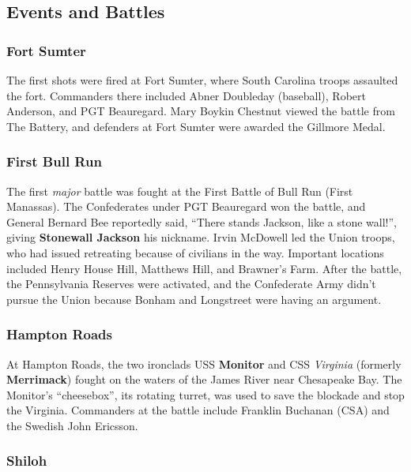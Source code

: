 
\subsection*{Events and Battles}

\subsubsection*{Fort Sumter}

The first shots were fired at Fort Sumter, where South Carolina troops assaulted the fort.
Commanders there included Abner Doubleday (baseball), Robert Anderson, and PGT Beauregard.
Mary Boykin Chestnut viewed the battle from The Battery,
and defenders at Fort Sumter were awarded the Gillmore Medal.

\subsubsection*{First Bull Run}

The first \textit{major} battle was fought at the First Battle of Bull Run (First Manassas).
The Confederates under PGT Beauregard won the battle,
and General Bernard Bee reportedly said, ``There stands Jackson, like a stone wall!'',
giving \textbf{Stonewall Jackson} his nickname.
Irvin McDowell led the Union troops, who had issued retreating because of civilians in the way.
Important locations included Henry House Hill, Matthews Hill, and Brawner's Farm.
After the battle, the Pennsylvania Reserves were activated,
and the Confederate Army didn't pursue the Union because Bonham and Longstreet were having an argument.

\subsubsection*{Hampton Roads}

At Hampton Roads, the two ironclads USS \textbf{Monitor} and CSS \textit{Virginia} (formerly \textbf{Merrimack})
fought on the waters of the James River near Chesapeake Bay.
The Monitor's ``cheesebox'', its rotating turret, was used to save the blockade and stop the Virginia.
Commanders at the battle include Franklin Buchanan (CSA) and the Swedish John Ericsson.

\subsubsection*{Shiloh}

